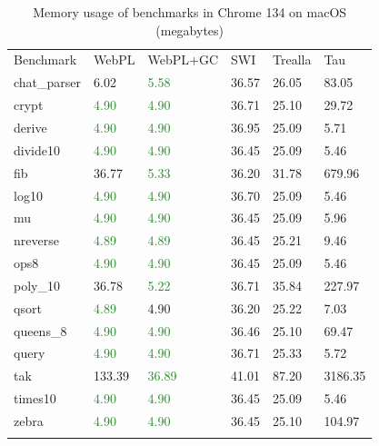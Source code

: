 \begin{table}[H]
\centering
{}
\begin{tabular}{llllll}
\addlinespace\hline\addlinespace
Benchmark & WebPL & WebPL+GC & SWI & Trealla & Tau \\
\addlinespace\hline\addlinespace
chat\_parser & 6.02 & \textcolor{ForestGreen}{5.58} & 36.57 & 26.05 & 83.05 \\
crypt & \textcolor{ForestGreen}{4.90} & \textcolor{ForestGreen}{4.90} & 36.71 & 25.10 & 29.72 \\
derive & \textcolor{ForestGreen}{4.90} & \textcolor{ForestGreen}{4.90} & 36.95 & 25.09 & 5.71 \\
divide10 & \textcolor{ForestGreen}{4.90} & \textcolor{ForestGreen}{4.90} & 36.45 & 25.09 & 5.46 \\
fib & 36.77 & \textcolor{ForestGreen}{5.33} & 36.20 & 31.78 & 679.96 \\
log10 & \textcolor{ForestGreen}{4.90} & \textcolor{ForestGreen}{4.90} & 36.70 & 25.09 & 5.46 \\
mu & \textcolor{ForestGreen}{4.90} & \textcolor{ForestGreen}{4.90} & 36.45 & 25.09 & 5.96 \\
nreverse & \textcolor{ForestGreen}{4.89} & \textcolor{ForestGreen}{4.89} & 36.45 & 25.21 & 9.46 \\
ops8 & \textcolor{ForestGreen}{4.90} & \textcolor{ForestGreen}{4.90} & 36.45 & 25.09 & 5.46 \\
poly\_10 & 36.78 & \textcolor{ForestGreen}{5.22} & 36.71 & 35.84 & 227.97 \\
qsort & \textcolor{ForestGreen}{4.89} & 4.90 & 36.20 & 25.22 & 7.03 \\
queens\_8 & \textcolor{ForestGreen}{4.90} & \textcolor{ForestGreen}{4.90} & 36.46 & 25.10 & 69.47 \\
query & \textcolor{ForestGreen}{4.90} & \textcolor{ForestGreen}{4.90} & 36.71 & 25.33 & 5.72 \\
tak & 133.39 & \textcolor{ForestGreen}{36.89} & 41.01 & 87.20 & 3186.35 \\
times10 & \textcolor{ForestGreen}{4.90} & \textcolor{ForestGreen}{4.90} & 36.45 & 25.09 & 5.46 \\
zebra & \textcolor{ForestGreen}{4.90} & \textcolor{ForestGreen}{4.90} & 36.45 & 25.10 & 104.97 \\
\addlinespace\hline\addlinespace
\end{tabular}
\caption{Memory usage of benchmarks in Chrome 134 on macOS (megabytes)}
\label{tab:chrome-memory}
\end{table}

